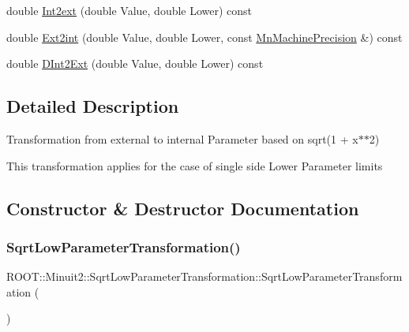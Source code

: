 \begin{DoxyCompactItemize}
\item 
double \mbox{\hyperlink{classROOT_1_1Minuit2_1_1SqrtLowParameterTransformation_aaa3325280a05beb0e3f07b542d0aa7d8}{Int2ext}} (double Value, double Lower) const
\item 
double \mbox{\hyperlink{classROOT_1_1Minuit2_1_1SqrtLowParameterTransformation_a2035002e75f51cafc5e5d8afc05913e6}{Ext2int}} (double Value, double Lower, const \mbox{\hyperlink{classROOT_1_1Minuit2_1_1MnMachinePrecision}{Mn\+Machine\+Precision}} \&) const
\item 
double \mbox{\hyperlink{classROOT_1_1Minuit2_1_1SqrtLowParameterTransformation_ade7d793a9299b15dc6e218a11efdb15e}{D\+Int2\+Ext}} (double Value, double Lower) const
\end{DoxyCompactItemize}


\subsection{Detailed Description}
Transformation from external to internal Parameter based on sqrt(1 + x$\ast$$\ast$2)

This transformation applies for the case of single side Lower Parameter limits 

\subsection{Constructor \& Destructor Documentation}
\mbox{\label{classROOT_1_1Minuit2_1_1SqrtLowParameterTransformation_a2ed65b844471f395ab4528823afe39b6}} 
\subsubsection{\texorpdfstring{SqrtLowParameterTransformation()}{SqrtLowParameterTransformation()}\hspace{0.1cm}{\footnotesize\ttfamily [1/3]}}
{\footnotesize\ttfamily R\+O\+O\+T\+::\+Minuit2\+::\+Sqrt\+Low\+Parameter\+Transformation\+::\+Sqrt\+Low\+Parameter\+Transformation (\begin{DoxyParamCaption}{ }\end{DoxyParamCaption})\hspace{0.3cm}{\ttfamily [inline]}}

